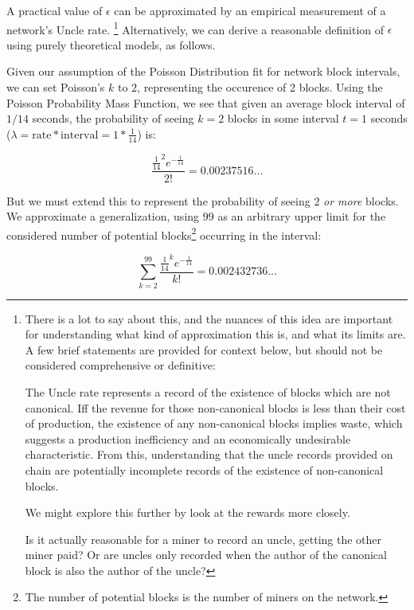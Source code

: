 \documentclass[11pt]{article}
\theoremstyle{plain}
\begin{document}
A practical value of $\epsilon$ can be approximated by an empirical measurement
of a network's Uncle rate.\nolinebreak
\footnote{
  There is a lot to say about this, and the nuances of this idea are important
for understanding what kind of approximation this is, and what its limits are.
  A few brief statements are provided for context below, but should not be
considered comprehensive or definitive:

  The Uncle rate represents a record of the existence of blocks which are not
canonical.
  Iff the revenue for those non-canonical blocks is less than their cost of
production, the existence of any non-canonical blocks implies waste, which
suggests a production inefficiency and an economically undesirable
characteristic.
  From this, understanding that the uncle records provided on chain are
potentially incomplete records of the existence of non-canonical blocks.

  We might explore this further by look at the rewards more closely.

  Is it actually reasonable for a miner to record an uncle, getting the
  other miner paid? Or are uncles only recorded when the author of the
  canonical block is also the author of the uncle?
}
Alternatively, we can derive a reasonable definition of $\epsilon$ using purely
theoretical models, as follows.

Given our assumption of the Poisson Distribution fit for network block
intervals, we can set Poisson's $k$ to 2, representing the occurence of 2
blocks.
Using the Poisson Probability Mass Function, we see that given an average block
interval of $1/14$ seconds, the probability of seeing $k=2$ blocks in some
interval $t=1$ seconds
($\lambda=\mathrm{rate}*\mathrm{interval}=1*\frac{1}{14}$) is:

\begin{equation}
  \frac{\frac{1}{14}^{2}e^{-\frac{1}{14}}}{2!} = 0.00237516...
\end{equation}

But we must extend this to represent the probability of seeing $2$ \emph{or
more} blocks.
We approximate a generalization, using $99$ as an arbitrary upper limit for the
considered number of potential blocks\footnote{The number of potential blocks
is the number of miners on the network.} occurring in the interval:

\begin{equation}
  \sum_{k=2}^{99}\frac{\frac{1}{14}^{k}e^{-\frac{1}{14}}}{k!} = 0.002432736...
\end{equation}
\end{document}
